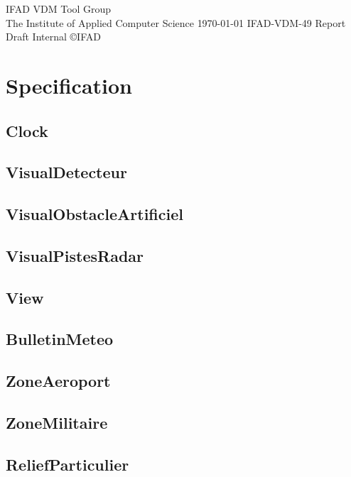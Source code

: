 \documentclass[11pt]{article}
\begin{document}
         {IFAD VDM Tool Group \\
          The Institute of Applied Computer Science}
         {\today}
         {IFAD-VDM-49}
         {Report}
         {Draft}
         {Internal}
         {\copyright IFAD}
         {\item[\mbox{}] \mbox{}}
         {\mbox{}}

\tableofcontents

\pagebreak

\section{Specification}

\subsection{Clock}

\subsection{VisualDetecteur}

\subsection{VisualObstacleArtificiel}

\subsection{VisualPistesRadar}

\subsection{View}

\subsection{BulletinMeteo}

\subsection{ZoneAeroport}

\subsection{ZoneMilitaire}

\subsection{ReliefParticulier}

\end{document}
